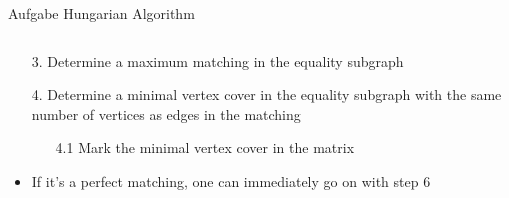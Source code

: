 \begin{frame}[allowframebreaks]{Aufgabe \thesection}{Hungarian Algorithm}
\begin{solutionnoinc}
\begin{columns}
\begin{column}{0.5\textwidth}
{\begin{tasktwocolumn}
            \end{tasktwocolumn}
        }
      \end{column}
      \begin{column}{0.5\textwidth}
      \end{column}
    \end{columns}
  \end{solutionnoinc}
  \begin{solutionnoinc}
    \begin{itemize}
      \item[3.] Determine a maximum matching in the equality subgraph
      \item[4.] Determine a minimal vertex cover in the equality subgraph with the same number of vertices as edges in the matching
      \begin{itemize}
        \item[4.1] Mark the minimal vertex cover in the matrix
      \end{itemize}
      \item If it's a perfect matching, one can immediately go on with step 6
    \end{itemize}
    \begin{columns}
      \begin{column}{0.5\textwidth}
        \centering
\end{column}
\end{columns}
\end{solutionnoinc}
\end{frame}
